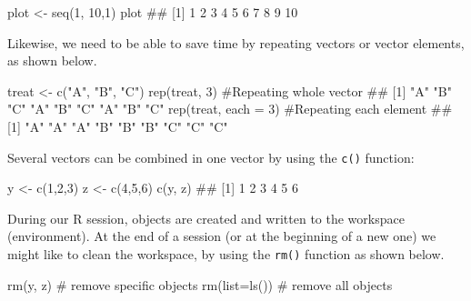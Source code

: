 \documentclass[a4paper,12pt,oneside]{book}
\newenvironment{Shaded}{\begin{snugshade}}{\end{snugshade}}
\newcommand{\DecValTok}[1]{#1}
\newcommand{\StringTok}[1]{#1}
\newcommand{\CommentTok}[1]{#1}
\newcommand{\DocumentationTok}[1]{#1}
\newcommand{\OtherTok}[1]{#1}
\newcommand{\FunctionTok}[1]{#1}
\newcommand{\AttributeTok}[1]{#1}
\newcommand{\NormalTok}[1]{#1}
\begin{document}
\begin{Shaded}
\begin{Highlighting}[]
\NormalTok{plot  }\OtherTok{\textless{}{-}}  \FunctionTok{seq}\NormalTok{(}\DecValTok{1}\NormalTok{, }\DecValTok{10}\NormalTok{,}\DecValTok{1}\NormalTok{)}
\NormalTok{plot}
\DocumentationTok{\#\#  [1]  1  2  3  4  5  6  7  8  9 10}
\end{Highlighting}
\end{Shaded}

Likewise, we need to be able to save time by repeating vectors or vector elements, as shown below.

\begin{Shaded}
\begin{Highlighting}[]
\NormalTok{treat }\OtherTok{\textless{}{-}} \FunctionTok{c}\NormalTok{(}\StringTok{"A"}\NormalTok{, }\StringTok{"B"}\NormalTok{, }\StringTok{"C"}\NormalTok{)}
\FunctionTok{rep}\NormalTok{(treat, }\DecValTok{3}\NormalTok{) }\CommentTok{\#Repeating whole vector}
\DocumentationTok{\#\# [1] "A" "B" "C" "A" "B" "C" "A" "B" "C"}
\FunctionTok{rep}\NormalTok{(treat, }\AttributeTok{each =} \DecValTok{3}\NormalTok{) }\CommentTok{\#Repeating each element}
\DocumentationTok{\#\# [1] "A" "A" "A" "B" "B" "B" "C" "C" "C"}
\end{Highlighting}
\end{Shaded}

Several vectors can be combined in one vector by using the \texttt{c()} function:

\begin{Shaded}
\begin{Highlighting}[]
\NormalTok{y }\OtherTok{\textless{}{-}} \FunctionTok{c}\NormalTok{(}\DecValTok{1}\NormalTok{,}\DecValTok{2}\NormalTok{,}\DecValTok{3}\NormalTok{)}
\NormalTok{z }\OtherTok{\textless{}{-}} \FunctionTok{c}\NormalTok{(}\DecValTok{4}\NormalTok{,}\DecValTok{5}\NormalTok{,}\DecValTok{6}\NormalTok{)}
\FunctionTok{c}\NormalTok{(y, z)}
\DocumentationTok{\#\# [1] 1 2 3 4 5 6}
\end{Highlighting}
\end{Shaded}

During our R session, objects are created and written to the workspace (environment). At the end of a session (or at the beginning of a new one) we might like to clean the workspace, by using the \texttt{rm()} function as shown below.

\begin{Shaded}
\begin{Highlighting}[]
\FunctionTok{rm}\NormalTok{(y, z) }\CommentTok{\# remove specific objects}
\FunctionTok{rm}\NormalTok{(}\AttributeTok{list=}\FunctionTok{ls}\NormalTok{()) }\CommentTok{\# remove all objects}
\end{Highlighting}
\end{Shaded}
\end{document}
